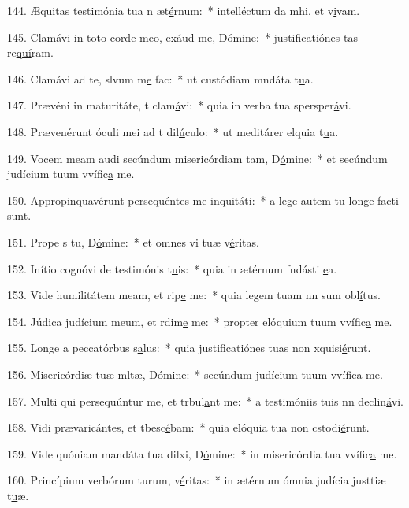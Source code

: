 144. Æquitas testimónia tua n æt\uline{é}rnum:~* intelléctum da mhi, et v\uline{i}vam.\par 
145. Clamávi in toto corde meo, exáud me, D\uline{ó}mine:~* justificatiónes tas re\uline{quí}ram.\par 
146. Clamávi ad te, slvum m\uline{e} fac:~* ut custódiam mndáta t\uline{u}a.\par 
147. Prævéni in maturitáte, t clam\uline{á}vi:~* quia in verba tua spersper\uline{á}vi.\par 
148. Prævenérunt óculi mei ad t dil\uline{ú}culo:~* ut meditárer elquia t\uline{u}a.\par 
149. Vocem meam audi secúndum misericórdiam tam, D\uline{ó}mine:~* et secúndum judícium tuum vvífic\uline{a} me.\par 
150. Appropinquavérunt persequéntes me inquit\uline{á}ti:~* a lege autem tu longe f\uline{a}cti sunt.\par 
151. Prope s tu, D\uline{ó}mine:~* et omnes vi tuæ v\uline{é}ritas.\par 
152. Inítio cognóvi de testimónis t\uline{u}is:~* quia in ætérnum fndásti \uline{e}a.\par 
153. Vide humilitátem meam, et rip\uline{e} me:~* quia legem tuam nn sum obl\uline{í}tus.\par 
154. Júdica judícium meum, et rdim\uline{e} me:~* propter elóquium tuum vvífic\uline{a} me.\par 
155. Longe a peccatórbus s\uline{a}lus:~* quia justificatiónes tuas non xquisi\uline{é}runt.\par 
156. Misericórdiæ tuæ mltæ, D\uline{ó}mine:~* secúndum judícium tuum vvífic\uline{a} me.\par 
157. Multi qui persequúntur me, et trbul\uline{a}nt me:~* a testimóniis tuis nn declin\uline{á}vi.\par 
158. Vidi prævaricántes, et tbesc\uline{é}bam:~* quia elóquia tua non cstodi\uline{é}runt.\par 
159. Vide quóniam mandáta tua dilxi, D\uline{ó}mine:~* in misericórdia tua vvífic\uline{a} me.\par 
160. Princípium verbórum turum, v\uline{é}ritas:~* in ætérnum ómnia judícia justtiæ t\uline{u}æ.\par 
